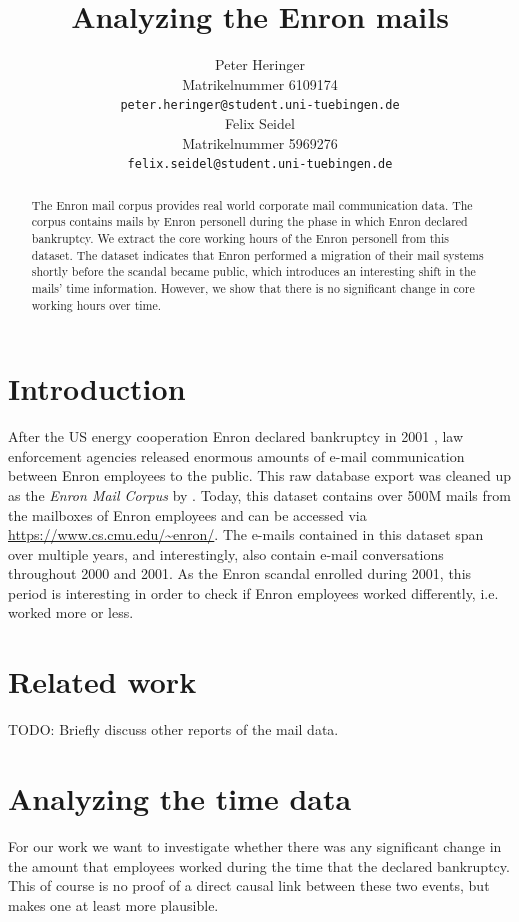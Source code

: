 \documentclass{article}
\title{Analyzing the Enron mails}
\author{%
  Peter Heringer\\
  Matrikelnummer 6109174 \\
  \texttt{peter.heringer@student.uni-tuebingen.de} \\
  \And
  Felix Seidel\\
  Matrikelnummer 5969276 \\
  \texttt{felix.seidel@student.uni-tuebingen.de} \\
}
\begin{document}
\maketitle

\begin{abstract}
  The Enron mail corpus provides real world corporate mail communication data. 
  The corpus contains mails by Enron personell during the phase in which Enron 
  declared bankruptcy. We extract the core working hours of the Enron personell 
  from this dataset. The dataset indicates that Enron performed a migration 
  of their mail systems shortly before the scandal became public, which
  introduces an interesting shift in the mails' time information. However, we
  show that there is no significant change in core working hours over time.
\end{abstract}

\section{Introduction}
After the US energy cooperation Enron declared bankruptcy in 2001
\citep{10.1257/089533003765888403}, law enforcement agencies released enormous
amounts of e-mail communication between Enron employees to the public. This raw
database export was cleaned up as the \emph{Enron Mail Corpus} by
\citet{Klimt2004IntroducingTE}. Today, this dataset contains over 500M mails
from the mailboxes of Enron employees and can be accessed via
\url{https://www.cs.cmu.edu/~enron/}. The e-mails contained in this dataset span
over multiple years, and interestingly, also contain e-mail conversations
throughout 2000 and 2001. As the Enron scandal enrolled during 2001, this period
is interesting in order to check if Enron employees worked differently, i.e.
worked more or less.


\section{Related work}
TODO: Briefly discuss other reports of the mail data.

\section{Analyzing the time data}
For our work we want to investigate whether there was any significant change in
the amount that employees worked during the time that the declared bankruptcy.
This of course is no proof of a direct causal link between these two events, but
makes one at least more plausible.
\end{document}
